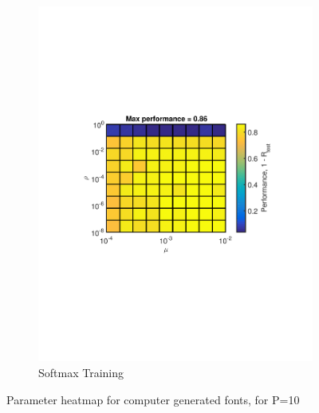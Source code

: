 \documentclass[journal,a4paper,onecolumn,11pt]{IEEEtran}
\begin{document}
\begin{figure}[!h]
\begin{subfigure}{.5\textwidth}
		\includegraphics[clip, trim=0cm .25cm 0cm .25cm, width=\textwidth]{para_opt_fnt_sm_sample2600.pdf}
		\caption{Softmax Training}
		\label{fig:para_opt_fnt_sm_sample2600}
	\end{subfigure}%
	\caption{Parameter heatmap for computer generated fonts, for P=10}
	\label{fig:heatmap_fnt}
\end{figure}
\end{document}

